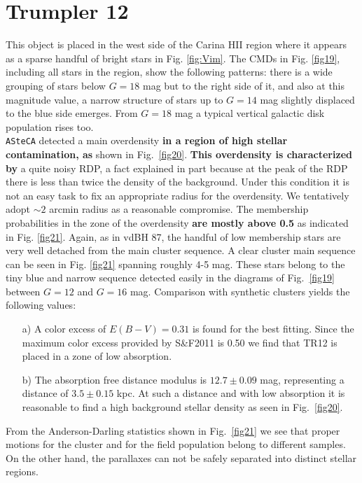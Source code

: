 \documentclass[referee]{aa}
\begin{document}
\section{Trumpler 12}

This object is placed in the west side of the Carina HII region where it appears
as a sparse handful of bright stars in Fig. \ref{fig:Vim}. The CMDs in Fig.
\ref{fig19}, including all stars in the region, show the following patterns:
there is a wide grouping of stars below $G=18$ mag but to the right side of
it, and also at this magnitude value, a narrow structure of stars up to $G=14$
mag slightly displaced to the blue side emerges. From $G=18$ mag a typical
vertical galactic disk population rises too.\\

\texttt{ASteCA} detected a main overdensity \textbf{in a region of high
stellar contamination, as} shown in Fig.~\ref{fig20}.
\textbf{This overdensity is characterized by} a quite noisy RDP, a fact
explained in part because at the peak of the RDP there is less than twice the
density of the background.
Under this condition it is not an easy task to fix an appropriate
radius for the overdensity. We tentatively adopt $\sim2$ arcmin radius as a
reasonable compromise.
The membership probabilities in the zone of the overdensity \textbf{are mostly
above 0.5} as indicated in Fig. \ref{fig21}. Again, as in vdBH 87, the
handful of low membership stars are very well detached from the main
cluster sequence.
%
A clear cluster main sequence can be seen in Fig. \ref{fig21} spanning roughly
4-5 mag. These stars belong to the tiny blue and narrow sequence detected
easily in the diagrams of Fig.~\ref{fig19} between $G=12$ and $G=16$
mag. Comparison with synthetic clusters yields the following values:

\begin{itemize}
\item [a)] A color excess of $E(B-V)=0.31$ is found for the best fitting.
    Since the maximum color excess provided by S\&F2011 is 0.50 we find that
    TR12 is placed in a zone of low absorption.
\item [b)] The absorption free distance modulus is $12.7\pm0.09$ mag,
representing a distance of $3.5\pm0.15$ kpc. At such a distance and with
low absorption it is reasonable to find a high background stellar density
as seen in Fig.~\ref{fig20}.
\end{itemize}

From the Anderson-Darling statistics shown in Fig.~\ref{fig21} we see that
proper motions for the cluster and for the field population belong to different
samples. On the other hand, the parallaxes can not be safely separated into
distinct stellar regions.\\
\end{document}

